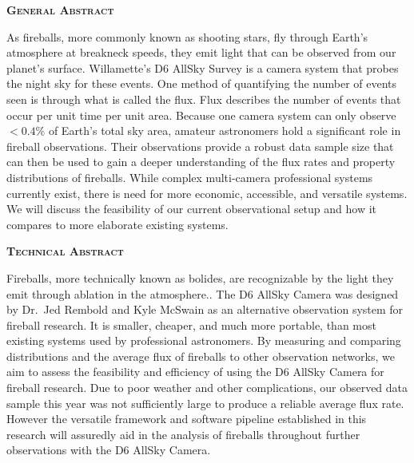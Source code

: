 \begin{flushleft}

\textbf{\textsc{\LARGE General Abstract}}

\vspace{0.2 in}

As fireballs, more commonly known as shooting stars, fly through Earth’s atmosphere at breakneck speeds, they emit light that can be observed from our planet’s surface. 
Willamette’s D6 AllSky Survey is a camera system that probes the night sky for these events.
One method of quantifying the number of events seen is through what is called the flux.
Flux describes the number of events that occur per unit time per unit area.
Because one camera system can only observe $<0.4\%$ of Earth’s total sky area, amateur astronomers hold a significant role in fireball observations.
Their observations provide a robust data sample size that can then be used to gain a deeper understanding of the flux rates and property distributions of fireballs.
While complex multi-camera professional systems currently exist, there is need for more economic, accessible, and versatile systems. 
We will discuss the feasibility of our current observational setup and how it compares to more elaborate existing systems.
\vspace{0.25 in}

\textbf{\textsc{\LARGE Technical Abstract}}

\vspace{0.2 in}

Fireballs, more technically known as bolides, are recognizable by the light they emit through ablation in the atmosphere.. 
The D6 AllSky Camera was designed by Dr.~Jed Rembold and Kyle McSwain as an alternative observation system for fireball research. 
It is smaller, cheaper, and much more portable, than most existing systems used by professional astronomers. 
By measuring and comparing distributions and the average flux of fireballs to other observation networks, we aim to assess the feasibility and efficiency of using the D6 AllSky Camera for fireball research.  
Due to poor weather and other complications, our observed data sample this year was not sufficiently large to produce a reliable average flux rate.
However the versatile framework and software pipeline established in this research will assuredly aid in the analysis of fireballs throughout further observations with the D6 AllSky Camera.

\end{flushleft}
